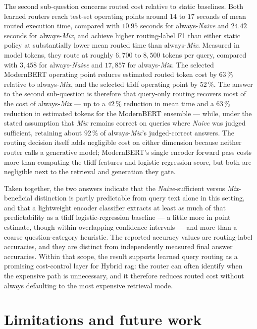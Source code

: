 \documentclass[english, bibtex]{kththesis}               %
\numberwithin{listing}{chapter}
\begin{document}
The second sub-question concerns routed cost relative to static baselines. Both learned routers reach test-set operating points around $14$ to $17$ seconds of mean routed execution time, compared with $10.95$ seconds for always-\emph{Naive} and $24.42$ seconds for always-\emph{Mix}, and achieve higher routing-label F1 than either static policy at substantially lower mean routed time than always-\emph{Mix}. Measured in model tokens, they route at roughly $6{,}700$ to $8{,}500$ tokens per query, compared with $3{,}458$ for always-\emph{Naive} and $17{,}857$ for always-\emph{Mix}. The selected ModernBERT operating point reduces estimated routed token cost by $63\,\%$ relative to always-\emph{Mix}, and the selected \gls{tfidf} operating point by $52\,\%$. The answer to the second sub-question is therefore that query-only routing recovers most of the cost of always-\emph{Mix} --- up to a $42\,\%$ reduction in mean time and a $63\,\%$ reduction in estimated tokens for the ModernBERT ensemble --- while, under the stated assumption that \emph{Mix} remains correct on queries where \emph{Naive} was judged sufficient, retaining about $92\,\%$ of always-\emph{Mix}'s judged-correct answers. The routing decision itself adds negligible cost on either dimension because neither router calls a generative model; ModernBERT's single encoder forward pass costs more than computing the \gls{tfidf} features and logistic-regression score, but both are negligible next to the retrieval and generation they gate.

Taken together, the two answers indicate that the \emph{Naive}-sufficient versus \emph{Mix}-beneficial distinction is partly predictable from query text alone in this setting, and that a lightweight encoder classifier extracts at least as much of that predictability as a \gls{tfidf} logistic-regression baseline --- a little more in point estimate, though within overlapping confidence intervals --- and more than a coarse question-category heuristic. The reported accuracy values are routing-label accuracies, and they are distinct from independently measured final answer accuracies. Within that scope, the result supports learned query routing as a promising cost-control layer for Hybrid \gls{rag}: the router can often identify when the expensive path is unnecessary, and it therefore reduces routed cost without always defaulting to the most expensive retrieval mode.

\section{Limitations and future work}
\label{sec:limitationsFutureWork}
\end{document}
